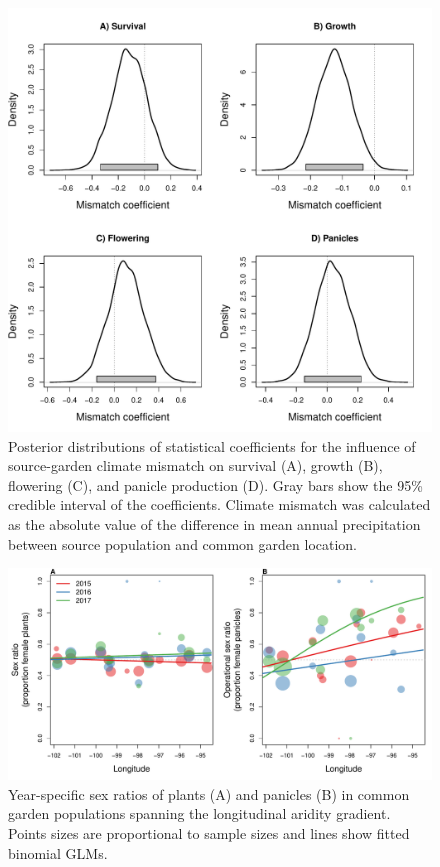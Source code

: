 \documentclass[11pt]{article}
\begin{document}
\newpage
\begin{figure}[H]
	\begin{center}
		\includegraphics[width=0.75\linewidth]{Figures/climate_mismatch}
		\caption{Posterior distributions of statistical coefficients for the influence of source-garden climate mismatch on survival (A), growth (B), flowering (C), and panicle production (D). Gray bars show the 95\% credible interval of the coefficients. Climate mismatch was calculated as the absolute value of the difference in mean annual precipitation between source population and common garden location.}
		\label{fig:climate_mismatch}
	\end{center}
\end{figure}

\newpage
\begin{figure}[H]
	\begin{center}
		\includegraphics[width=0.75\linewidth]{Figures/garden_sex_ratios}
		\caption{Year-specific sex ratios of plants (A) and panicles (B) in common garden populations spanning the longitudinal aridity gradient. Points sizes are proportional to sample sizes and lines show fitted binomial GLMs.}
		\label{fig:gardens_by_year}
	\end{center}
\end{figure}
\end{document}
